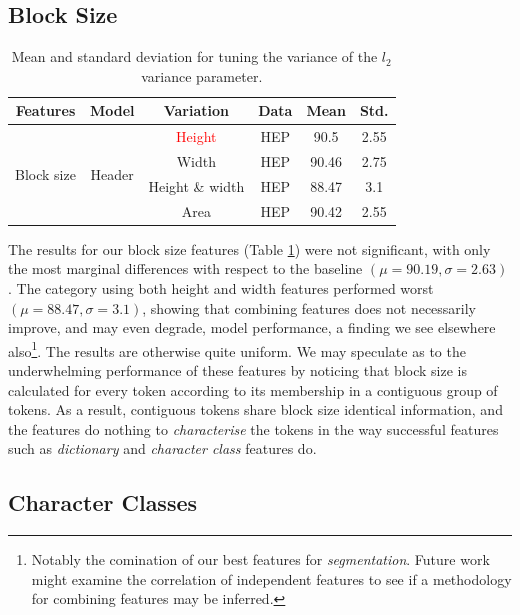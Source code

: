 \subsection{Block Size}

\begin{table}[h]
\begin{center}
\begin{tabular}{|c|c|c|c|c|c|}
\hline
Features & Model & Variation & Data & Mean & Std.\\
\hline
\multirow{4}{*}{Block size} & \multirow{4}{*}{Header} & \textcolor{red}{Height} & HEP & 90.5 & 2.55\\\cline{3-6}
& & Width & HEP & 90.46 & 2.75\\\cline{3-6}
& & Height \& width & HEP  & 88.47 & 3.1\\\cline{3-6}
& & Area & HEP  & 90.42 & 2.55\\\cline{3-6}
\hline
\end{tabular}
\caption[Mean and standard deviation for subsampling CORA data set.]{Mean and standard deviation for tuning the variance of the $l_2$ variance parameter.}
\label{table:blockshaperesults}
\end{center}
\end{table}

The results for our block size features (Table \ref{table:blockshaperesults}) were not significant, with only the most marginal differences with respect to the baseline $(\mu = 90.19, \sigma = 2.63)$. The category using both height and width features performed worst $(\mu = 88.47, \sigma = 3.1)$, showing that combining features does not necessarily improve, and may even degrade, model performance, a finding we see elsewhere also\footnote{Notably the comination of our best features for \emph{segmentation}. Future work might examine the correlation of independent features to see if a methodology for combining features may be inferred.}. The results are otherwise quite uniform. We may speculate as to the underwhelming performance of these features by noticing that block size is calculated for every token according to its membership in a contiguous group of tokens. As a result, contiguous tokens share block size identical information, and the features do nothing to \emph{characterise} the tokens in the way successful features such as \emph{dictionary} and \emph{character class} features do.

\subsection{Character Classes}

